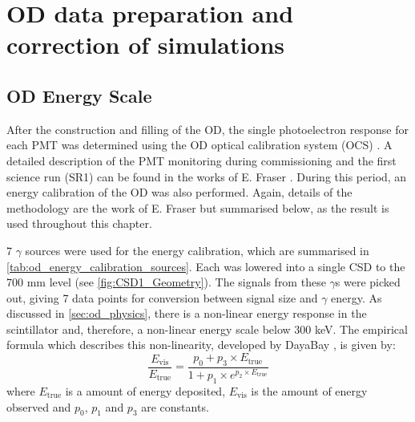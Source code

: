\section{OD data preparation and correction of simulations}

\subsection{OD Energy Scale} \label{sec:od_energy_scale}
\par
After the construction and filling of the OD, the single photoelectron response for each PMT was determined using the OD optical calibration system (OCS) \cite{lz_ocs_system_ref}.
A detailed description of the PMT monitoring during commissioning and the first science run (SR1) can be found in the works of E. Fraser \cite{ewanfraser_thesis_ref}. 
During this period, an energy calibration of the OD was also performed.
Again, details of the methodology are the work of E. Fraser \cite{ewanfraser_thesis_ref} but summarised below, as the result is used throughout this chapter.
\par
7 $\gamma$ sources were used for the energy calibration, which are summarised in \autoref{tab:od_energy_calibration_sources}.
Each was lowered into a single CSD to the 700 mm level (see \autoref{fig:CSD1_Geometry}).
The signals from these $\gamma$s were picked out, giving 7 data points for conversion between signal size and $\gamma$ energy.
As discussed in \autoref{sec:od_physics}, there is a non-linear energy response in the scintillator and, therefore, a non-linear energy scale below 300 keV.
The empirical formula which describes this non-linearity, developed by DayaBay \cite{dayabay_antineutrino_oscillation_ref, ls_nonlinear_energy_response_ref}, is given by:
\begin{equation}
    \frac{E_{\text{vis}}}{E_{\text{true}}} = \frac{p_0  + p_3 \times E_{\text{true}}}{1 + p_1 \times e^{p_2 \times E_{\text{true}}}}
    \label{eq:ls_light_response}
\end{equation}
where $E_{\text{true}}$ is a amount of energy deposited, $E_{\text{vis}}$ is the amount of energy observed and $p_0$, $p_1$ and $p_3$ are constants.

